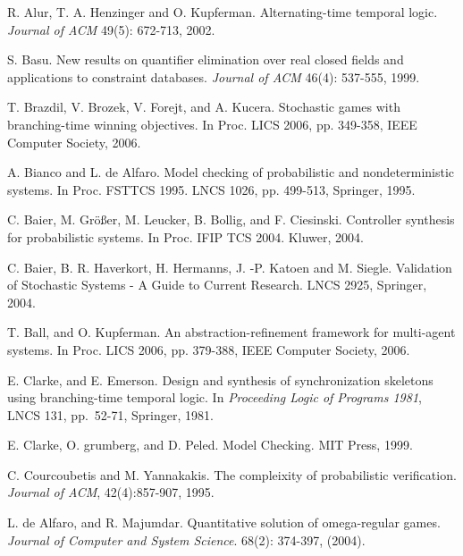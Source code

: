 \documentclass[times, 10 pt,twocolumn]{article}
\begin{document}
\begin{thebibliography}{00}

 R. Alur, T. A. Henzinger and O. Kupferman. Alternating-time temporal logic.
{\em Journal of ACM} 49(5): 672-713, 2002.

 S. Basu. New results on quantifier elimination over real closed fields and
applications to constraint databases. {\em Journal of ACM} 46(4):
537-555, 1999.

 T. Brazdil, V. Brozek, V. Forejt, and A. Kucera. Stochastic
games with branching-time winning objectives. In Proc. LICS 2006,
pp. 349-358, IEEE Computer Society, 2006.

 A. Bianco and L. de Alfaro. Model checking of probabilistic and
nondeterministic systems.  In Proc. FSTTCS 1995. LNCS 1026, pp.
499-513, Springer, 1995.

 C. Baier, M. Gr\"{o}\ss er, M. Leucker, B. Bollig,
and F. Ciesinski. Controller synthesis for probabilistic systems.
In Proc. IFIP TCS 2004. Kluwer, 2004.

C. Baier, B. R. Haverkort, H. Hermanns, J. -P. Katoen and M.
Siegle. Validation of Stochastic Systems - A Guide to Current
Research. LNCS 2925, Springer, 2004.


T. Ball, and O. Kupferman. An abstraction-refinement framework for
multi-agent systems. In Proc. LICS 2006, pp. 379-388, IEEE
Computer Society, 2006.

 E. Clarke, and E. Emerson. Design and synthesis of synchronization skeletons
using branching-time temporal logic. In {\em Proceeding Logic of
Programs 1981}, LNCS 131, pp.\ 52-71, Springer, 1981.

 E. Clarke, O. grumberg, and D. Peled. {\rm Model
Checking}. MIT Press, 1999.

 C. Courcoubetis and M. Yannakakis. The compleixity
of probabilistic verification. \emph{Journal of ACM},
42(4):857-907, 1995.

 L. de Alfaro, and R. Majumdar. Quantitative solution of omega-regular games.
{\em Journal of  Computer and System Science}. 68(2): 374-397,
(2004).


\end{thebibliography}
\end{document}
